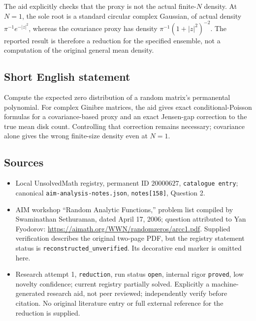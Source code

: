 \documentclass[11pt]{article}
\begin{document}
The aid explicitly checks that the proxy is not the actual finite-$N$ density. At $N=1$, the sole root is a standard circular complex Gaussian, of actual density $\pi^{-1}e^{-|z|^2}$, whereas the covariance proxy has density $\pi^{-1}(1+|z|^2)^{-2}$. The reported result is therefore a reduction for the specified ensemble, not a computation of the original general mean density.
\subsection{Short English statement}
Compute the expected zero distribution of a random matrix's permanental polynomial. For complex Ginibre matrices, the aid gives exact conditional-Poisson formulas for a covariance-based proxy and an exact Jensen-gap correction to the true mean disk count. Controlling that correction remains necessary; covariance alone gives the wrong finite-size density even at $N=1$.
\subsection{Sources}
\begin{itemize}
\item Local UnsolvedMath registry, permanent ID $20000627$, \texttt{catalogue entry}; canonical \texttt{aim-analysis-notes.json}, \texttt{notes[158]}, Question 2.
\item AIM workshop ``Random Analytic Functions,'' problem list compiled by Swaminathan Sethuraman, dated April 17, 2006; question attributed to Yan Fyodorov: \url{https://aimath.org/WWN/randomzeros/arcc1.pdf}. Supplied verification describes the original two-page PDF, but the registry statement status is \texttt{reconstructed\_unverified}. Its decorative end marker is omitted here.
\item Research attempt 1, \texttt{reduction}, run status \texttt{open}, internal rigor \texttt{proved}, low novelty confidence; current registry partially solved. Explicitly a machine-generated research aid, not peer reviewed; independently verify before citation. No original literature entry or full external reference for the reduction is supplied.
\end{itemize}
\end{document}
